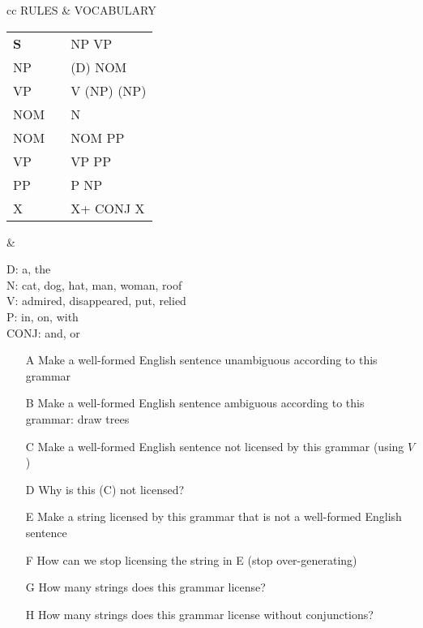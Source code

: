 \documentclass[a4paper,landscape,headrule,footrule]{foils}
\begin{document}
\begin{tabular}{cc}
  RULES & VOCABULARY \\[2ex]
  \begin{minipage}[t]{0.4\linewidth}
    \begin{tabular}[t]{lll}
      \textbf{S}  & \into & NP VP \\
      NP & \into & (D) NOM\\
      VP & \into & V (NP) (NP)\\
      NOM & \into & N\\
      NOM & \into & NOM PP \\
      VP  & \into & VP PP\\
      PP  & \into & P NP\\
      X   & \into & X+ CONJ X\\
    \end{tabular} 
  \end{minipage} &
  \begin{minipage}[t]{0.5\linewidth}
    \begin{flushleft}
  D: a, the\\
  N: cat, dog, hat, man, woman, roof\\
  V: admired, disappeared, put, relied\\
  P: in, on, with\\
  CONJ: and, or
\end{flushleft}
\end{minipage}
\end{tabular}




\begin{itemize}
\item [A] Make a well-formed English sentence unambiguous
according to this grammar
\item  [B] Make a well-formed English sentence ambiguous
according to this grammar: draw trees
\item  [C] Make a well-formed English sentence not licensed by
this grammar (using $V$)
\item [D] Why is this (C) not licensed?

\newpage
\item [E] Make a string licensed by this grammar that is not a
  well-formed English sentence
\item [F] How can we stop licensing the string in E (stop over-generating)
\item [G] How many strings does this grammar license?
\item [H] How many strings does this grammar license without conjunctions?
\end{itemize}
\end{document}

